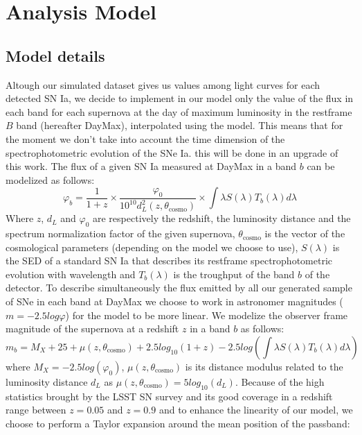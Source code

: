 \documentclass[\docopts]{\docclass}
\begin{document}

\section{Analysis Model}
\label{sec::analysis_model}

\subsection{Model details}
\label{subsec::model_details}
Altough our simulated dataset gives us values among light curves for each detected SN Ia, we decide to implement in our model only the value of the flux in each band for each supernova at the day of maximum luminosity in the restframe $B$ band (hereafter DayMax), interpolated using the  model.
This means that for the moment we don't take into account the time dimension of the spectrophotometric evolution of the SNe Ia. this will be done in an upgrade of this work.
The flux of a given SN Ia measured at DayMax in a band $b$ can be modelized as follows:
\begin{equation}
\varphi_b = \frac{1}{1+z} \times \frac{\varphi_0}{10^{10}d_L^2(z, \theta_\text{cosmo})}\times \int \lambda S(\lambda) T_b(\lambda) d\lambda
\end{equation}
Where $z$, $d_L$ and $\varphi_0$ are respectively the redshift, the luminosity distance and the spectrum normalization factor of the given supernova,
$\theta_\text{cosmo}$ is the vector of the cosmological parameters (depending on the model we choose to use),
$S(\lambda)$ is the SED of a standard SN Ia that describes its restframe spectrophotometric evolution with wavelength
and $T_b(\lambda)$ is the troughput of the band $b$ of the detector.
To describe simultaneously the flux emitted by all our generated sample of SNe in each band at DayMax we choose to work in astronomer magnitudes ($m=-2.5 log\varphi$) for the model to be more linear.
We modelize the observer frame magnitude of the supernova at a redshift $z$ in a band $b$ as follows:
\begin{equation}
\label{eq::raw_model}
 m_b = M_X + 25 + \mu(z, \theta_\text{cosmo}) + 2.5log_{10}(1+z) - 2.5log(\int \lambda S(\lambda) T_b(\lambda) d\lambda) 
\end{equation}
where $M_X = -2.5 log(\varphi_0)$, $\mu(z, \theta_\text{cosmo})$ is its distance modulus related to the luminosity distance $d_L$ as $\mu(z, \theta_\text{cosmo}) = 5log_{10}(d_L)$.
Because of the high statistics brought by the LSST SN survey and its good coverage in a redshift range between $z=0.05$ and $z=0.9$ and to enhance the linearity of our model, we choose to perform a Taylor expansion around the mean position of the passband:
\end{document}
